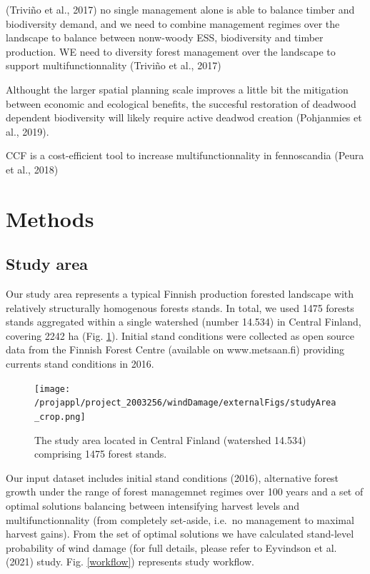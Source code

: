 \documentclass[]{elsarticle} %
\begin{document}
(Triviño et al., 2017) no single management alone is able to balance timber and biodiversity demand, and we need to combine management regimes over the landscape to balance between nonw-woody ESS, biodiversity and timber production. WE need to diversity forest management over the landscape to support multifunctionnality (Triviño et al., 2017)

Althought the larger spatial planning scale improves a little bit the mitigation between economic and ecological benefits, the succesful restoration of deadwood dependent biodiversity will likely require active deadwod creation (Pohjanmies et al., 2019).

CCF is a cost-efficient tool to increase multifunctionnality in fennoscandia (Peura et al., 2018)

\hypertarget{methods}{%
\section{Methods}\label{methods}}

\hypertarget{study-area}{%
\subsection{Study area}\label{study-area}}

Our study area represents a typical Finnish production forested landscape with relatively structurally homogenous forests stands. In total, we used 1475 forests stands aggregated within a single watershed (number 14.534) in Central Finland, covering 2242 ha (Fig. \ref{study_area}). Initial stand conditions were collected as open source data from the Finnish Forest Centre (available on www.metsaan.fi) providing currents stand conditions in 2016.

\begin{figure}
\centering
\texttt{[image: /projappl/project\_2003256/windDamage/externalFigs/studyArea\_crop.png]}
\caption{The study area located in Central Finland (watershed 14.534) comprising 1475 forest stands.\label{study_area}}
\end{figure}

Our input dataset includes initial stand conditions (2016), alternative forest growth under the range of forest managemnet regimes over 100 years and a set of optimal solutions balancing between intensifying harvest levels and multifunctionnality (from completely set-aside, i.e.~no management to maximal harvest gains). From the set of optimal solutions we have calculated stand-level probability of wind damage (for full details, please refer to Eyvindson et al. (2021) study. Fig. \ref{workflow}) represents study workflow.
\end{document}
